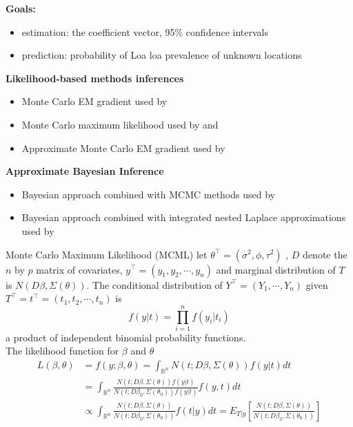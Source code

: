 \documentclass[11pt,compress,UTF8]{beamer}
\begin{document}
\begin{frame}
\textbf{Goals:}
\begin{itemize}
\item estimation: the coefficient vector, 95\% confidence intervals 
\item prediction: probability of Loa loa prevalence of unknown locations 
\end{itemize}

\textbf{Likelihood-based methods inferences} 
\begin{itemize}
\item Monte Carlo EM gradient used by \citet{Zhang2002On}
\item Monte Carlo maximum likelihood used by \citet{Christensen2004} and \citet{Diggle2016}
\item Approximate Monte Carlo EM gradient used by \citet{Hosseini2016}
\end{itemize}

\textbf{Approximate Bayesian Inference}
\begin{itemize}
\item Bayesian approach combined with MCMC methods used by \citet{Diggle1998,Diggle2002}
\item Bayesian approach combined with integrated nested Laplace approximations 
used by \citet{Eidsvik2009Approximate,Rue2009,Rue2017arXiv}
\end{itemize}
\end{frame}


\begin{frame}{Monte Carlo Maximum Likelihood (MCML)}
let $\theta^{\top}=(\sigma^2,\phi,\tau^2)$ , $D$ denote the $n$ by $p$ matrix of covariates, 
$y^{\top}=(y_1,y_2,\cdots,y_n)$ and marginal distribution of $T$ is $N(D\beta,\Sigma(\theta))$.
The conditional distribution of $Y^{\top}=(Y_1,\cdots,Y_n)$ given $T^{\top}=t^{\top}=(t_1,t_2,\cdots,t_n)$ is $$f(y|t)=\prod_{i=1}^{n}f(y_{i}|t_{i})$$  
a product of independent binomial probability functions.\\

The likelihood function for $\beta$ and $\theta$
\begin{equation*}
\begin{aligned}
L(\beta,\theta)& =f(y;\beta,\theta)=\int_{\mathbb{R}^{n}} N(t;D\beta,\Sigma(\theta))f(y|t)dt\\
& = \int_{\mathbb{R}^{n}} \frac{N(t;D\beta,\Sigma(\theta))f(y|t)}{N(t;D\beta_{0},\Sigma(\theta_{0}))f(y|t)}f(y,t)dt\\
& \varpropto \int_{\mathbb{R}^{n}} \frac{N(t;D\beta,\Sigma(\theta))}{N(t;D\beta_{0},\Sigma(\theta_{0}))}f(t|y)dt = E_{T|y}\left[\frac{N(t;D\beta,\Sigma(\theta))}{N(t;D\beta_{0},\Sigma(\theta_{0}))}\right]
\end{aligned}
\end{equation*}
\end{frame}
\end{document}
